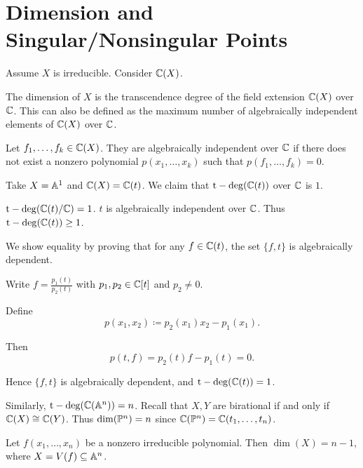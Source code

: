 
\section{Dimension and Singular/Nonsingular Points}

Assume $X$ is irreducible.
Consider $\c(X)$.

\begin{definition}
    The dimension of $X$ is the transcendence degree of the field extension $\c(X)$ over $\c$.
    This can also be defined as the maximum number of algebraically independent elements of $\c(X)$ over $\c$.
\end{definition}

\begin{definition}
    Let $f_1,\ldots,f_k \in \c(X)$.
    They are algebraically independent over $\c$ if there does not exist a nonzero polynomial $p(x_1,\ldots,x_k)$ such that $p(f_1,\ldots,f_k) = 0$.
\end{definition}

\begin{example}
    Take $X = \aa^1$ and $\c(X) = \c(t)$.
    We claim that $\tdeg(\c(t))$ over $\c$ is $1$.
\end{example}

\begin{proposition}{
    $\tdeg(\c(t)/\c) = 1$.
}
    $t$ is algebraically independent over $\c$.
    Thus $\tdeg(\c(t)) \geq 1$.

    We show equality by proving that for any $f \in \c(t)$, the set $\{f,t\}$ is algebraically dependent.

    Write $f = \frac{p_1(t)}{p_2(t)}$ with $p_1, p_2 \in \c[t]$ and $p_2 \neq 0$.

    Define
    \[
        p(x_1,x_2) \coloneqq p_2(x_1)x_2 - p_1(x_1).
    \]

    Then
    \[
        p(t,f) = p_2(t)f - p_1(t) = 0.
    \]

    Hence $\{f,t\}$ is algebraically dependent, and $\tdeg(\c(t)) = 1$.
\end{proposition}

Similarly, $\tdeg(\c(\aa^n)) = n$.
Recall that $X,Y$ are birational if and only if $\c(X) \cong \c(Y)$.
Thus $\dim(\pp^n) = n$ since $\c(\pp^n) = \c(t_1,\ldots,t_n)$.

\begin{theorem*}{
    Let $f(x_1,\ldots,x_n)$ be a nonzero irreducible polynomial.
    Then $\dim(X) = n - 1$, where $X = V(f) \subseteq \aa^n$.
}
\end{theorem*}

